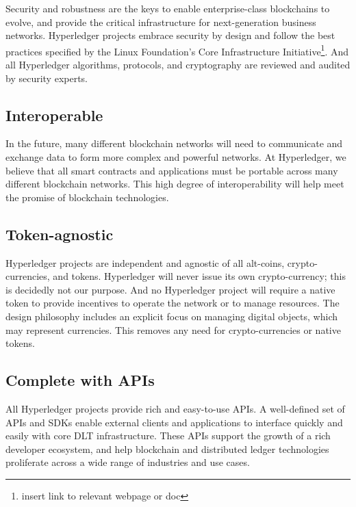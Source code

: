 Security and robustness are the keys to enable enterprise-class blockchains to evolve, and provide the critical infrastructure for next-generation business networks. 
Hyperledger projects embrace security by design and follow the best practices specified by the Linux Foundation's Core Infrastructure Initiative\footnote{insert link to relevant webpage or doc}.
And all Hyperledger algorithms, protocols, and cryptography are reviewed and audited by security experts.

\subsection{Interoperable} 
In the future, many different blockchain networks will need to communicate and exchange data to form more complex and powerful networks. 
At Hyperledger, we believe that all smart contracts and applications must be portable across many different blockchain networks. 
This high degree of interoperability will help meet the promise of blockchain technologies. 

\subsection{Token-agnostic}
Hyperledger projects are independent and agnostic of all alt-coins, crypto-currencies, and tokens. 
Hyperledger will never issue its own crypto-currency; this is decidedly not our purpose. 
And no Hyperledger project will require a native token to provide incentives to operate the network or to manage resources. 
The design philosophy includes an explicit focus on managing digital objects, which may represent currencies. 
This removes any need for crypto-currencies or native tokens.

\subsection{Complete with APIs}
All Hyperledger projects provide rich and easy-to-use APIs. 
A well-defined set of APIs and SDKs enable external clients and applications to interface quickly and easily with core DLT infrastructure. 
These APIs support the growth of a rich developer ecosystem, and help blockchain and distributed ledger technologies proliferate across a wide range of industries and use cases.
